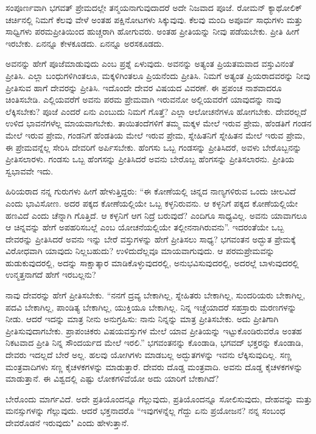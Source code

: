 ಸಂಪೂರ್ಣವಾಗಿ ಭಗವತ್ ಪ್ರೇಮದಲ್ಲೇ ತನ್ಮಯನಾಗುವುದಾದರೆ ಅದೇ ನಿಜವಾದ ಪೂಜೆ. ರೋಮನ್ ಕ್ಯಾಥೋಲಿಕ್ ಚರ್ಚಿನಲ್ಲಿ ನಿಮಗೆ ಕೆಲವು ವೇಳೆ ಅಂತಹ ಪಕ್ಷಿನೋಟಗಳು ಸಿಕ್ಕುವುವು. ಕೆಲವು ಮಂದಿ ಅಪೂರ್ವ ಸಾಧುಗಳು ಮತ್ತು ಸಾಧ್ವಿಗಳು ಪರಮಪ್ರೀತಿಯಿಂದ ಹುಚ್ಚರಾಗಿ ಹೋಗುವರು. ಅಂತಹ ಪ್ರೀತಿಯನ್ನು ನೀವು ಪಡೆಯಬೇಕು. ಪ್ರೀತಿ ಹೀಗೆ ಇರಬೇಕು. ಏನನ್ನೂ ಕೇಳಕೂಡದು. ಏನನ್ನೂ ಅರಸಕೂಡದು.

ಅವನನ್ನು ಹೇಗೆ ಪೂಜೆಮಾಡುವುದು ಎಂಬ ಪ್ರಶ್ನೆ ಏಳುವುದು. ಅವನನ್ನು ಅತ್ಯಂತ ಪ್ರಿಯತಮವಾದ ವಸ್ತುವಿನಂತೆ ಪ್ರೀತಿಸಿ. ಎಲ್ಲಾ ಬಂಧುಗಳಿಗಿಂತಲೂ, ಮಕ್ಕಳಿಗಿಂತಲೂ ಪ್ರಿಯನೆಂದು ಪ್ರೀತಿಸಿ. ನಿಮಗೆ ಅತ್ಯಂತ ಪ್ರಿಯರಾದವರನ್ನು ನೀವು ಪ್ರೀತಿಸುವ ಹಾಗೆ ದೇವರನ್ನು ಪ್ರೀತಿಸಿ. ಇದೊಂದೇ ದೇವರ ವಿಷಯದ ವಿವರಣೆ. ಈ ಪ್ರಪಂಚ ನಾಶವಾದರೂ ಚಿಂತಿಸಬೇಡಿ. ಎಲ್ಲಿಯವರೆಗೆ ಅವನು ಪರಮ ಪ್ರೇಮವಾಗಿ ಇರುವನೋ ಅಲ್ಲಿಯವರೆಗೆ ಯಾವುದನ್ನು ನಾವು ಲೆಕ್ಕಿಸಬೇಕು? ಪೂಜೆ ಎಂದರೆ ಏನು ಎಂಬುದು ನಿಮಗೆ ಗೊತ್ತೆ? ಎಲ್ಲಾ ಆಲೋಚನೆಗಳೂ ಹೋಗಬೇಕು. ದೇವರಲ್ಲದೆ ಉಳಿದ ಭಾವನೆಗಳೆಲ್ಲ ಮಾಯವಾಗಬೇಕು. ತಾಯಿತಂದೆಗಳಿಗೆ ತಮ್ಮ ಮಕ್ಕಳ ಮೇಲೆ ಇರುವ ಪ್ರೇಮ, ಹೆಂಡತಿಗೆ ಗಂಡನ ಮೇಲೆ ಇರುವ ಪ್ರೇಮ, ಗಂಡನಿಗೆ ಹೆಂಡತಿಯ ಮೇಲೆ ಇರುವ ಪ್ರೇಮ, ಸ್ನೇಹಿತನಿಗೆ ಸ್ನೇಹಿತನ ಮೇಲೆ ಇರುವ ಪ್ರೇಮ, ಈ ಪ್ರೇಮವನ್ನೆಲ್ಲ ಸೇರಿಸಿ ದೇವರಿಗೆ ಅರ್ಪಿಸಬೇಕು. ಹೆಂಗಸು ಒಬ್ಬ ಗಂಡಸನ್ನು ಪ್ರೀತಿಸಿದರೆ, ಅವಳು ಬೇರೊಬ್ಬನನ್ನು ಪ್ರೀತಿಸಲಾರಳು. ಗಂಡಸು ಒಬ್ಬ ಹೆಂಗಸನ್ನು ಪ್ರೀತಿಸಿದರೆ ಅವನು ಬೇರೊಬ್ಬ ಹೆಂಗಸನ್ನು ಪ್ರೀತಿಸಲಾರನು. ಪ್ರೀತಿಯ ಸ್ವಭಾವವೇ ಇದು.

ಹಿರಿಯರಾದ ನನ್ನ ಗುರುಗಳು ಹೀಗೆ ಹೇಳುತ್ತಿದ್ದರು: “ಈ ಕೋಣೆಯಲ್ಲಿ ಚಿನ್ನದ ನಾಣ್ಯಗಳಿರುವ ಒಂದು ಚೀಲವಿದೆ ಎಂದು ಭಾವಿಸೋಣ. ಅದರ ಪಕ್ಕದ ಕೋಣೆಯಲ್ಲಿಯೇ ಒಬ್ಬ ಕಳ್ಳನಿರುವನು. ಆ ಕಳ್ಳನಿಗೆ ಪಕ್ಕದ ಕೋಣೆಯಲ್ಲಿಯೇ ಹಣವಿದೆ ಎಂದು ಚೆನ್ನಾಗಿ ಗೊತ್ತಿದೆ. ಆ ಕಳ್ಳನಿಗೆ ಆಗ ನಿದ್ರೆ ಬರುವುದೆ? ಎಂದಿಗೂ ಸಾಧ್ಯವಿಲ್ಲ. ಅವನು ಯಾವಾಗಲೂ ಆ ಚಿನ್ನವನ್ನು ಹೇಗೆ ಅಪಹರಿಸಬಲ್ಲೆ ಎಂಬ ಯೋಚನೆಯಲ್ಲಿಯೇ ತಲ್ಲೀನನಾಗಿರುವನು''. ಇದರಂತೆಯೇ ಒಬ್ಬ ದೇವರನ್ನು ಪ್ರೀತಿಸಿದರೆ ಅವನು ಇನ್ನು ಬೇರೆ ವಸ್ತುಗಳನ್ನು ಹೇಗೆ ಪ್ರೀತಿಸಲು ಸಾಧ್ಯ? ಭಗವಂತನ ಅದ್ಭುತ ಪ್ರೇಮಕ್ಕೆ ವಿರೋಧವಾಗಿ ಯಾವುದು ನಿಲ್ಲಬಹುದು? ಉಳಿದುದೆಲ್ಲವೂ ಮಾಯವಾಗುವುದು. ಆ ಪರಮಪ್ರೇಮವನ್ನು ಹುಡುಕುವುದರಲ್ಲಿ, ಅದನ್ನು ಸಾಕ್ಷಾತ್ಕಾರ ಮಾಡಿಕೊಳ್ಳುವುದರಲ್ಲಿ, ಅನುಭವಿಸುವುದರಲ್ಲಿ, ಅದರಲ್ಲೆ ಬಾಳುವುದರಲ್ಲಿ ಉನ್ಮತ್ತನಾಗದೆ ಹೇಗೆ ಇರಬಲ್ಲನು?

ನಾವು ದೇವರನ್ನು ಹೇಗೆ ಪ್ರೀತಿಸಬೇಕು. “ನನಗೆ ದ್ರವ್ಯ ಬೇಕಾಗಿಲ್ಲ, ಸ್ನೇಹಿತರು ಬೇಕಾಗಿಲ್ಲ, ಸುಂದರಿಯರು ಬೇಕಾಗಿಲ್ಲ, ಪದವಿ ಬೇಕಾಗಿಲ್ಲ, ಪಾಂಡಿತ್ಯ ಬೇಕಾಗಿಲ್ಲ, ಯುಕ್ತಿಯೂ ಬೇಕಾಗಿಲ್ಲ. ನಿನ್ನ ಇಚ್ಚೆಯಾದರೆ ಸಹಸ್ರಾರು ಮರಣಗಳನ್ನು ನೀಡು. ಆದರೆ ಇದನ್ನು ಮಾತ್ರ ನೀನು ಅನುಗ್ರಹಿಸು: ನಾನು ನಿನ್ನನ್ನು ಮಾತ್ರ ಪ್ರೀತಿಸಬೇಕು. ಅದು ಪ್ರೀತಿಗಾಗಿ ಪ್ರೀತಿಸುವುದಾಗಬೇಕು. ಪ್ರಾಪಂಚಿಕರು ವಿಷಯವಸ್ತುಗಳ ಮೇಲೆ ಯಾವ ಪ್ರೀತಿಯನ್ನು ಇಟ್ಟುಕೊಂಡಿರುವರೊ ಅಂತಹ ನಿಕಟವಾದ ಪ್ರೀತಿ ನಿನ್ನ ಸೌಂದರ್ಯದ ಮೇಲೆ ಇರಲಿ.” ಭಗವಂತನನ್ನು ಕೊಂಡಾಡಿ, ಭಗವದ್ ಭಕ್ತರನ್ನು ಕೊಂಡಾಡಿ, ದೇವರು ಇದಲ್ಲದೆ ಬೇರೆ ಅಲ್ಲ. ಹಲವು ಯೋಗಿಗಳು ಮಾಡಬಲ್ಲ ಅದ್ಭುತಗಳನ್ನು ಇವನು ಲೆಕ್ಕಿಸುವುದಿಲ್ಲ. ಸಣ್ಣ ಮಂತ್ರವಾದಿಗಳು ಸಣ್ಣ ಕೈಚಳಕಗಳನ್ನು ಮಾಡುತ್ತಾರೆ. ದೇವರು ದೊಡ್ಡ ಮಂತ್ರವಾದಿ. ಅವನು ದೊಡ್ಡ ಕೈಚಳಕಗಳನ್ನು ಮಾಡುತ್ತಾನೆ. ಈ ವಿಶ್ವದಲ್ಲಿ ಎಷ್ಟು ಲೋಕಗಳಿವೆಯೋ ಅದು ಯಾರಿಗೆ ಬೇಕಾಗಿದೆ?

ಬೇರೊಂದು ಮಾರ್ಗವಿದೆ. ಅದೇ ಪ್ರತಿಯೊಂದನ್ನೂ ಗೆಲ್ಲುವುದು, ಪ್ರತಿಯೊಂದನ್ನೂ ಸೋಲಿಸುವುದು, ದೇಹವನ್ನು ಮತ್ತು ಮನಸ್ಸುಗಳನ್ನು ಗೆಲ್ಲುವುದು. ಆದರೆ ಭಕ್ತನಾದರೊ “ಇವುಗಳನ್ನೆಲ್ಲ ಗೆದ್ದು ಏನು ಪ್ರಯೋಜನ? ನನ್ನ ಸಂಬಂಧ ದೇವರೊಡನೆ ಇರುವುದು" ಎಂದು ಹೇಳುತ್ತಾನೆ.

